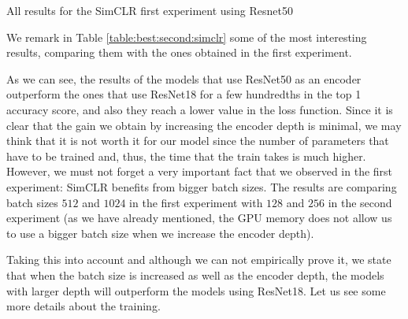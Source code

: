 \begin{table}[H]
        \caption{All results for the SimCLR first experiment using Resnet50}
        \label{table:simclr:gridsearch:2}    
    \end{table}
    
    We remark in Table \ref{table:best:second:simclr} some of the most interesting results, comparing them with the ones obtained in the first experiment.

    \begin{table}[H]
    \centering
    \caption{Best results for the second grid search experiment with SimCLR.}
    
    \label{table:best:second:simclr}
    \end{table}

    As we can see, the results of the models that use ResNet50  as an encoder outperform the ones that use ResNet18 for a few hundredths in the top 1 accuracy score, and also they reach a lower value in the loss function. Since it is clear that the gain we obtain by increasing the encoder depth is minimal, we may think that it is not worth it for our model since the number of parameters that have to be trained and, thus, the time that the train takes is much higher. However, we must not forget a very important fact that we observed in the first experiment: SimCLR benefits from bigger batch sizes. The results are comparing batch sizes $512$ and $1024$ in the first experiment with $128$ and $256$ in the second experiment (as we have already mentioned, the GPU memory does not allow us to use a bigger batch size when we increase the encoder depth).

    Taking this into account and although we can not empirically prove it, we state that when the batch size is increased as well as the encoder depth, the models with larger depth will outperform the models using ResNet18. Let us see some more details about the training.

